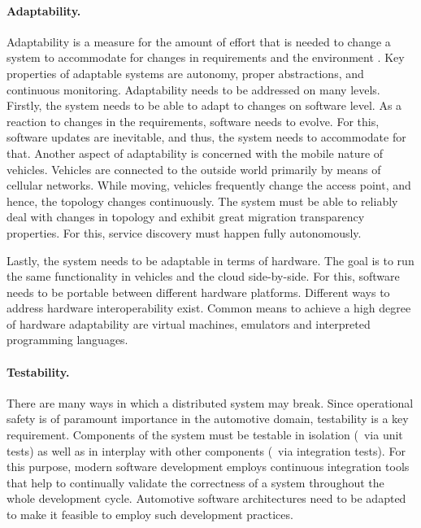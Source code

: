 \paragraph{Adaptability.}
Adaptability is a measure for the amount of effort that is needed to change a system to accommodate for changes in requirements and the environment \cite{o2007quality}. Key properties of adaptable systems are autonomy, proper abstractions, and continuous monitoring. Adaptability needs to be addressed on many levels. Firstly, the system needs to be able to adapt to changes on software level. As a reaction to changes in the requirements, software needs to evolve. For this, software updates are inevitable, and thus, the system needs to accommodate for that. Another aspect of adaptability is concerned with the mobile nature of vehicles. Vehicles are connected to the outside world primarily by means of cellular networks. While moving, vehicles frequently change the access point, and hence, the topology changes continuously. The system must be able to reliably deal with changes in topology and exhibit great migration transparency properties. For this, service discovery must happen fully autonomously.

Lastly, the system needs to be adaptable in terms of hardware. The goal is to run the same functionality in vehicles and the cloud side-by-side. For this, software needs to be portable between different hardware platforms. Different ways to address hardware interoperability exist. Common means to achieve a high degree of hardware adaptability are virtual machines, emulators and interpreted programming languages.


\paragraph{Testability.}
There are many ways in which a distributed system may break. Since operational safety is of paramount importance in the automotive domain, testability is a key requirement. Components of the system must be testable in isolation (\eg\ via unit tests) as well as in interplay with other components (\eg\ via integration tests). For this purpose, modern software development employs continuous integration tools that help to continually validate the correctness of a system throughout the whole development cycle. Automotive software architectures need to be adapted to make it feasible to employ such development practices.


%
%
%
%
%
%
%
%
%
%
